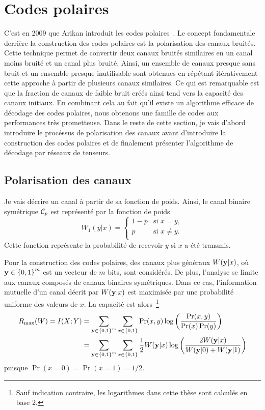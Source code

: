 \section{Codes polaires}
\label{sec:codes_polaires}


C'est en 2009 que Arikan introduit les codes polaires~\cite{arikan_channel_2009}.
Le concept fondamentale derrière la construction des codes polaires est la polarisation
des canaux bruités.
Cette technique permet de convertir deux canaux bruités similaires en un canal moins bruité
et un canal plus bruité.
Ainsi,
un ensemble de canaux presque sans bruit et un ensemble presque inutilisable
sont obtenues en répétant itérativement cette approche à partir de plusieurs canaux similaires.
Ce qui est remarquable est que la fraction de canaux de faible bruit créés ainsi
tend vers la capacité des canaux initiaux.
En combinant cela au fait qu'il existe un algorithme efficace de décodage des codes polaires,
nous obtenons une famille de codes aux performances très prometteuse.
Dans le reste de cette section,
je vais d'abord introduire le procéssus de polarisation des canaux
avant d'introduire la construction des codes polaires
et de finalement présenter l'algorithme de décodage par réseaux de tenseurs. 

\subsection{Polarisation des canaux}

Je vais décrire un canal à partir de sa fonction de poids. 
Ainsi,
le canal binaire symétrique $\mathcal{C}_p$ est représenté par la fonction de poids
\begin{equation}
  W_1(y|x) =
  \begin{cases}
    1 - p & \text{si } x = y,\\
    p & \text{si } x \neq y.\\
  \end{cases}
\end{equation}
Cette fonction représente la probabilité de recevoir $y$ si $x$ a été transmis.

Pour la construction des codes polaires,
des canaux plus généraux $W(\vb y | x)$,
où $\vb y \in \qty{0, 1}^m$ est un vecteur de $m$ bits,
sont considérés.
De plus, 
l'analyse se limite aux canaux composés de canaux binaires symétriques.
Dans ce cas, l'information mutuelle d'un canal décrit par $W(\vb y | x)$
est maximisée par une probabilité uniforme des valeurs de $x$.
La capacité est alors~\footnote{
  Sauf indication contraire, les logarithmes dans cette thèse sont calculés en base 2.
}
\begin{align}
  R_{\text{max}}(W) 
  = I(X ; Y)
  &= \sum_{\vb y \in \qty{0, 1}^m}\sum_{x \in \qty{0, 1}} 
  \Pr(x, y) \log\qty(\frac{\Pr(x, y)}{\Pr(x) \Pr(y)})\notag\\
  &= \sum_{\vb y \in \qty{0, 1}^m}\sum_{x \in \qty{0, 1}} 
  \frac{1}{2}W(\vb y | x) \log\qty(\frac{2 W(\vb y | x)}{W(\vb y | 0) + W(\vb y | 1)})
  \label{eq:capacite_symetrique}
\end{align}
puisque $\Pr(x = 0) = \Pr(x = 1) = 1/2$.

